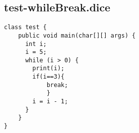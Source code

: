 \subsection{test-whileBreak.dice}
\begin{verbatim}
class test {
	public void main(char[][] args) {
	  int i;
	  i = 5;
	  while (i > 0) {
	    print(i);
	    if(i==3){
	    	break;
	    	}
	    i = i - 1;
	  }
	}
}
\end{verbatim}